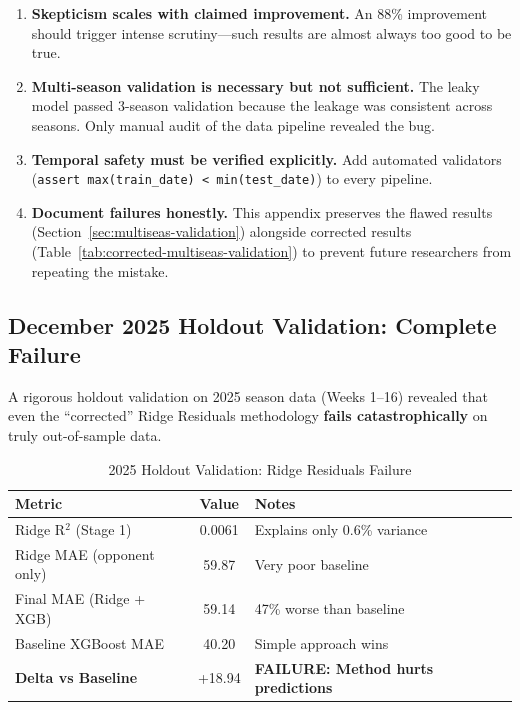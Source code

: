 \begin{enumerate}
  \item \textbf{Skepticism scales with claimed improvement.} An 88\% improvement should trigger intense scrutiny---such results are almost always too good to be true.

  \item \textbf{Multi-season validation is necessary but not sufficient.} The leaky model passed 3-season validation because the leakage was consistent across seasons. Only manual audit of the data pipeline revealed the bug.

  \item \textbf{Temporal safety must be verified explicitly.} Add automated validators (\texttt{assert max(train\_date) < min(test\_date)}) to every pipeline.

  \item \textbf{Document failures honestly.} This appendix preserves the flawed results (Section~\ref{sec:multiseas-validation}) alongside corrected results (Table~\ref{tab:corrected-multiseas-validation}) to prevent future researchers from repeating the mistake.
\end{enumerate}

\subsection{December 2025 Holdout Validation: Complete Failure}
\label{sec:dec-2025-failure}

A rigorous holdout validation on 2025 season data (Weeks 1--16) revealed that even the ``corrected'' Ridge Residuals methodology \textbf{fails catastrophically} on truly out-of-sample data.

\begin{table}[htbp]
\centering
\small
\caption{2025 Holdout Validation: Ridge Residuals Failure}
\label{tab:2025-holdout-failure}
\begin{tabular}{@{}lS[table-format=2.2]l@{}}
\toprule
\textbf{Metric} & {\textbf{Value}} & \textbf{Notes} \\
\midrule
Ridge R$^2$ (Stage 1) & 0.0061 & Explains only 0.6\% variance \\
Ridge MAE (opponent only) & 59.87 & Very poor baseline \\
Final MAE (Ridge + XGB) & 59.14 & 47\% worse than baseline \\
Baseline XGBoost MAE & 40.20 & Simple approach wins \\
\midrule
\textbf{Delta vs Baseline} & {+18.94} & \textbf{FAILURE: Method hurts predictions} \\
\bottomrule
\end{tabular}
\end{table}

